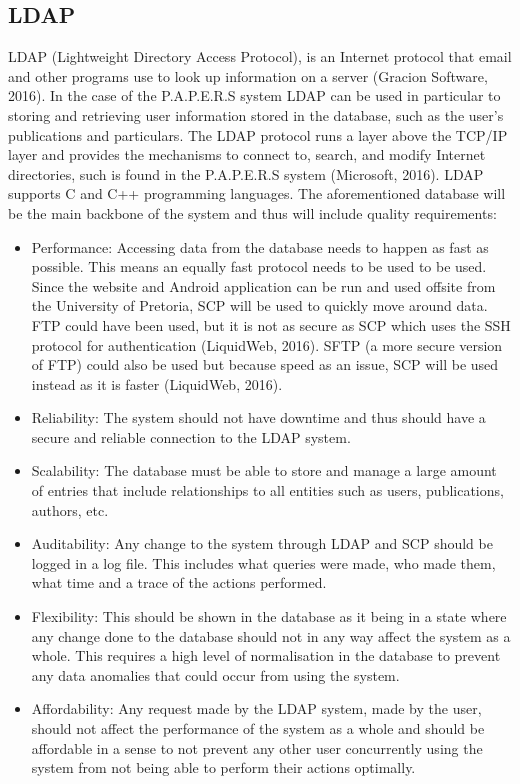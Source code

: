 \documentclass[12pt, letterpaper, twoside]{article}
\begin{document}
    \subsection{LDAP}
    LDAP (Lightweight Directory Access Protocol), is an Internet protocol that email and other programs use to look up information on a server (Gracion Software, 2016). In the case of the P.A.P.E.R.S system LDAP can be used in particular to storing and retrieving user information stored in the database, such as the user’s publications and particulars. The LDAP protocol runs a layer above the TCP/IP layer and provides the mechanisms to connect to, search, and modify Internet directories, such is found in the P.A.P.E.R.S system (Microsoft, 2016). LDAP supports C and C++ programming languages. The aforementioned database will be the main backbone of the system and thus will include quality requirements:
    \begin{itemize}  

        \item Performance: Accessing data from the database needs to happen as fast as possible. This means an equally fast protocol needs to be used to be used. Since the website and Android application can be run and used offsite from the University of Pretoria, SCP will be used to quickly move around data. FTP could have been used, but it is not as secure as SCP which uses the SSH protocol for authentication (LiquidWeb, 2016). SFTP (a more secure version of FTP) could also be used but because speed as an issue, SCP will be used instead as it is faster (LiquidWeb, 2016).
        \item Reliability: The system should not have downtime and thus should have a secure and reliable connection to the LDAP system.
        \item Scalability: The database must be able to store and manage a large amount of entries that include relationships to all entities such as users, publications, authors, etc. 
        \item Auditability: Any change to the system through LDAP and SCP should be logged in a log file. This includes what queries were made, who made them, what time and a trace of the actions performed.
        \item Flexibility: This should be shown in the database as it being in a state where any change done to the database should not in any way affect the system as a whole. This requires a high level of normalisation in the database to prevent any data anomalies that could occur from using the system.
        \item Affordability: Any request made by the LDAP system, made by the user, should not affect the performance of the system as a whole and should be affordable in a sense to not prevent any other user concurrently using the system from not being able to perform their actions optimally.
    \end{itemize}
    \endsubsection{}
\end{document}
